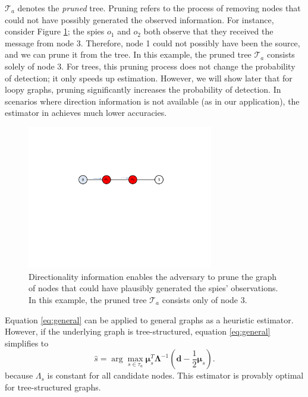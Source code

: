$\mathcal T_a$ denotes the \emph{pruned} tree. Pruning refers to the process of removing nodes that could not have possibly generated the observed information. For instance, consider Figure \ref{fig:pruning}; the spies $o_1$ and $o_2$ both observe that they received the message from node 3. Therefore, node 1 could not possibly have been the source, and we can prune it from the tree. In this example, the pruned tree $\mathcal T_a$ consists solely of node 3. For trees, this pruning process does not change the probability of detection; it only speeds up estimation. However, we will show later that for loopy graphs, pruning significantly increases the probability of detection. In scenarios where direction information is not available (as in our application), the estimator in \cite{pinto} achieves much lower accuracies.

\begin{figure}[h]
\centering
\includegraphics[width = 3.2in]{figures/pruning}
\caption{Directionality information enables the adversary to prune the graph of nodes that could have plausibly generated the spies' observations. In this example, the pruned tree $\mathcal T_a$ consists only of node 3.}
\label{fig:pruning}
\end{figure}


Equation \ref{eq:general} can be applied to general graphs as a heuristic estimator. However, if the underlying graph is tree-structured, equation \ref{eq:general} simplifies to
\begin{equation}
\label{eq:tree}
\hat{s} = \arg\max_{s \in \tau_{a}} \boldsymbol{\mu}_{s}^{T} \boldsymbol{\Lambda}^{-1} (\boldsymbol{d} - \frac{1}{2}\boldsymbol{\mu}_s).
\end{equation}
because $\Lambda_s$ is constant for all candidate nodes. This estimator is provably optimal for tree-structured graphs.

